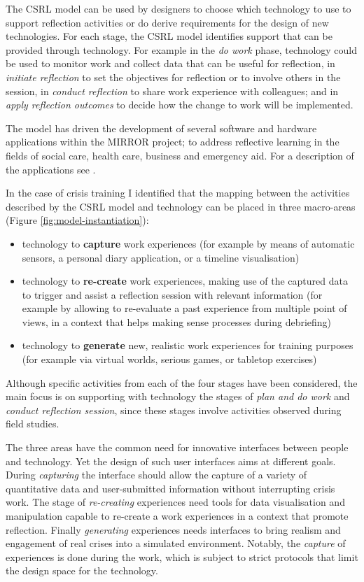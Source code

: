 The CSRL model can be used by designers to choose which technology to use to support reflection activities or do derive requirements for the design of new technologies. For each stage, the CSRL model identifies support that can be provided through technology. For example in the \emph{do work} phase, technology could be used to monitor work and collect data that can be useful for reflection, in \emph{initiate reflection} to set the objectives for reflection or to involve others in the session, in \emph{conduct reflection} to share work experience with colleagues; and in \emph{apply reflection outcomes} to decide how the change to work will be implemented.

The model has driven the development of several software and hardware applications within the MIRROR project; to address reflective learning in the fields of social care, health care, business and emergency aid. For a description of the applications see \autocite{Schwantzer:2014we}. 

In the case of crisis training I identified that the mapping between the activities described by the CSRL model and technology can be placed in three macro-areas (Figure \ref{fig:model-instantiation}):

\begin{itemize}
	\itemsep1pt\parskip0pt 
	\item technology to \textbf{capture} work experiences (for example by means of automatic sensors, a personal diary application, or a timeline visualisation) 
	\item technology to \textbf{re-create} work experiences, making use of the captured data to trigger and assist a reflection session with relevant information (for example by allowing to re-evaluate a past experience from multiple point of views, in a context that helps making sense processes during debriefing) 
	\item technology to \textbf{generate} new, realistic work experiences for training purposes (for example via virtual worlds, serious games, or tabletop exercises) 
\end{itemize}

Although specific activities from each of the four stages have been considered, the main focus is on supporting with technology the stages of \emph{plan and do work} and \emph{conduct reflection session}, since these stages involve activities observed during field studies.

The three areas have the common need for innovative interfaces between people and technology. Yet the design of such user interfaces aims at different goals. During \emph{capturing} the interface should allow the capture of a variety of quantitative data and user-submitted information without interrupting crisis work. The stage of \emph{re-creating} experiences need tools for data visualisation and manipulation capable to re-create a work experiences in a context that promote reflection. Finally \emph{generating} experiences needs interfaces to bring realism and engagement of real crises into a simulated environment. Notably, the \emph{capture} of experiences is done during the work, which is subject to strict protocols that limit the design space for the technology.

